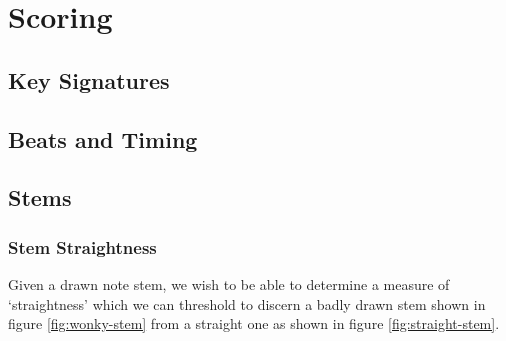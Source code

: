 \section{Scoring}

\subsection{Key Signatures}

\subsection{Beats and Timing}

\subsection{Stems}
\subsubsection{Stem Straightness}

Given a drawn note stem, we wish to be able to determine a measure of `straightness' which we can threshold to discern a badly drawn stem shown in figure \ref{fig:wonky-stem} from a straight one  as shown in figure \ref{fig:straight-stem}.

